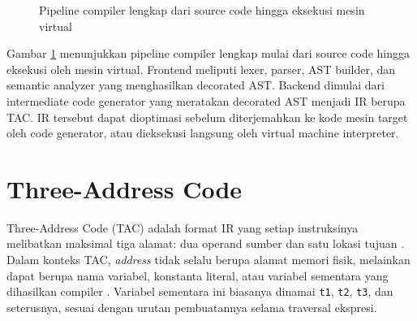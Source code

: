 \begin{figure}[H]
    \centering
    \caption{Pipeline compiler lengkap dari source code hingga eksekusi mesin virtual}
    \label{fig:intermediate-pipeline}
\end{figure}

Gambar \ref{fig:intermediate-pipeline} menunjukkan pipeline compiler lengkap mulai dari source code hingga eksekusi oleh mesin virtual. Frontend meliputi lexer, parser, AST builder, dan semantic analyzer yang menghasilkan decorated AST. Backend dimulai dari intermediate code generator yang meratakan decorated AST menjadi IR berupa TAC. IR tersebut dapat dioptimasi sebelum diterjemahkan ke kode mesin target oleh code generator, atau dieksekusi langsung oleh virtual machine interpreter.


\section{Three-Address Code}

Three-Address Code (TAC) adalah format IR yang setiap instruksinya melibatkan maksimal tiga alamat: dua operand sumber dan satu lokasi tujuan \cite{aho2007compilers}. Dalam konteks TAC, \textit{address} tidak selalu berupa alamat memori fisik, melainkan dapat berupa nama variabel, konstanta literal, atau variabel sementara yang dihasilkan compiler \cite{cooper2011engineering}. Variabel sementara ini biasanya dinamai \texttt{t1}, \texttt{t2}, \texttt{t3}, dan seterusnya, sesuai dengan urutan pembuatannya selama traversal ekspresi.

